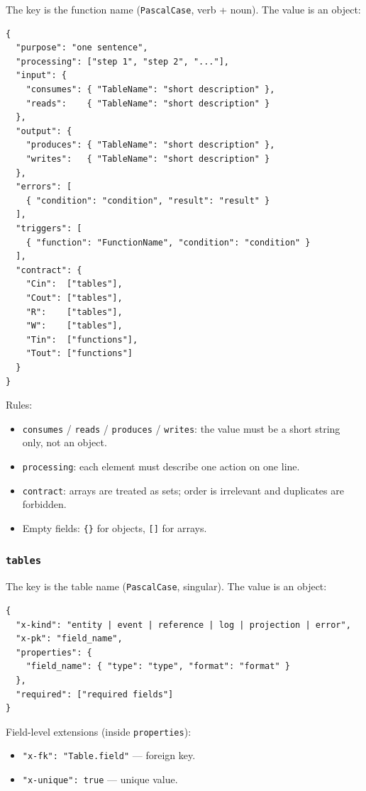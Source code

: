 The key is the function name (\texttt{PascalCase}, verb + noun). The value is an object:

\begin{lstlisting}
{
  "purpose": "one sentence",
  "processing": ["step 1", "step 2", "..."],
  "input": {
    "consumes": { "TableName": "short description" },
    "reads":    { "TableName": "short description" }
  },
  "output": {
    "produces": { "TableName": "short description" },
    "writes":   { "TableName": "short description" }
  },
  "errors": [
    { "condition": "condition", "result": "result" }
  ],
  "triggers": [
    { "function": "FunctionName", "condition": "condition" }
  ],
  "contract": {
    "Cin":  ["tables"],
    "Cout": ["tables"],
    "R":    ["tables"],
    "W":    ["tables"],
    "Tin":  ["functions"],
    "Tout": ["functions"]
  }
}
\end{lstlisting}

Rules:

\begin{itemize}
\item \texttt{consumes} / \texttt{reads} / \texttt{produces} / \texttt{writes}: the value must be a short string only, not an object.
\item \texttt{processing}: each element must describe one action on one line.
\item \texttt{contract}: arrays are treated as sets; order is irrelevant and duplicates are forbidden.
\item Empty fields: \texttt{\{\}} for objects, \texttt{[]} for arrays.
\end{itemize}

\subsubsection{\texttt{tables}}

The key is the table name (\texttt{PascalCase}, singular). The value is an object:

\begin{lstlisting}
{
  "x-kind": "entity | event | reference | log | projection | error",
  "x-pk": "field_name",
  "properties": {
    "field_name": { "type": "type", "format": "format" }
  },
  "required": ["required fields"]
}
\end{lstlisting}

Field-level extensions (inside \texttt{properties}):

\begin{itemize}
\item \texttt{"x-fk": "Table.field"} --- foreign key.
\item \texttt{"x-unique": true} --- unique value.
\end{itemize}

